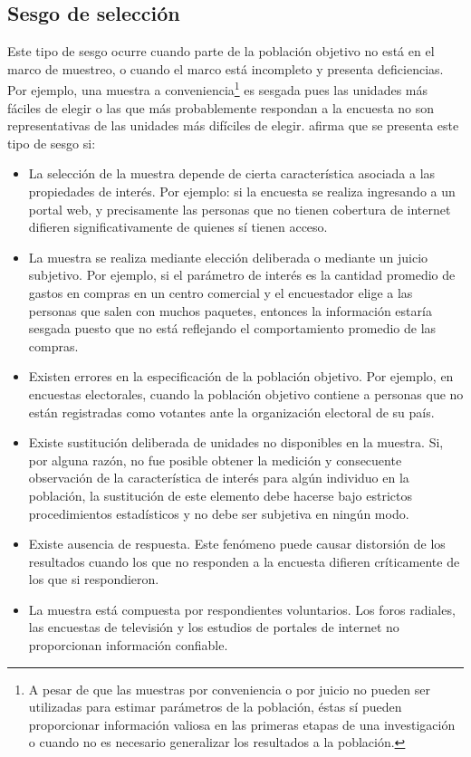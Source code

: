 \documentclass[
  12pt,
]{book}
\providecommand{\tightlist}{%
  \setlength{\itemsep}{0pt}\setlength{\parskip}{0pt}}
\begin{document}
\hypertarget{sesgo-de-selecciuxf3n}{%
\subsection{Sesgo de selección}\label{sesgo-de-selecciuxf3n}}

Este tipo de sesgo ocurre cuando parte de la población objetivo no está en el marco de muestreo, o cuando el marco está incompleto y presenta deficiencias. Por ejemplo, una muestra a conveniencia\footnote{A pesar de que las muestras por conveniencia o por juicio no pueden ser utilizadas para estimar parámetros de la población, éstas sí pueden proporcionar información valiosa en las primeras etapas de una investigación o cuando no es necesario generalizar los resultados a la población.} es sesgada pues las unidades más fáciles de elegir o las que más probablemente respondan a la encuesta no son representativas de las unidades más difíciles de elegir. \citet{Loh} afirma que se presenta este tipo de sesgo si:

\begin{itemize}
\tightlist
\item
  La selección de la muestra depende de cierta característica asociada a las propiedades de interés. Por ejemplo: si la encuesta se realiza ingresando a un portal web, y precisamente las personas que no tienen cobertura de internet difieren significativamente de quienes sí tienen acceso.
\item
  La muestra se realiza mediante elección deliberada o mediante un juicio subjetivo. Por ejemplo, si el parámetro de interés es la cantidad promedio de gastos en compras en un centro comercial y el encuestador elige a las personas que salen con muchos paquetes, entonces la información estaría sesgada puesto que no está reflejando el comportamiento promedio de las compras.
\item
  Existen errores en la especificación de la población objetivo. Por ejemplo, en encuestas electorales, cuando la población objetivo contiene a personas que no están registradas como votantes ante la organización electoral de su país.
\item
  Existe sustitución deliberada de unidades no disponibles en la muestra. Si, por alguna razón, no fue posible obtener la medición y consecuente observación de la característica de interés para algún individuo en la población, la sustitución de este elemento debe hacerse bajo estrictos procedimientos estadísticos y no debe ser subjetiva en ningún modo.
\item
  Existe ausencia de respuesta. Este fenómeno puede causar distorsión de los resultados cuando los que no responden a la encuesta difieren críticamente de los que si respondieron.
\item
  La muestra está compuesta por respondientes voluntarios. Los foros radiales, las encuestas de televisión y los estudios de portales de internet no proporcionan información confiable.
\end{itemize}
\end{document}
